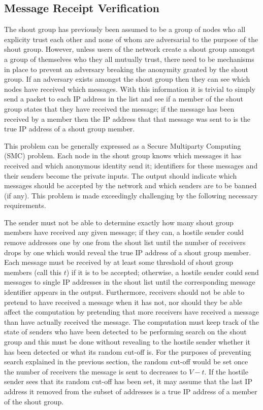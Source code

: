 \documentclass[ %
                    author={Luke Murray},
                supervisor={Dr. Simon Hollis},
                     title={Shadow Peer-to-Peer Networks},
                  subtitle={},
                    degree={MEng},
                      year={2013} ]{thesis}
\begin{document}
\subsection{Message Receipt Verification}

The shout group has previously been assumed to be a group of nodes who all explicity trust each other and none of whom are adversarial to the purpose of the shout group. However, unless users of the network create a shout group amongst a group of themselves who they all mutually trust, there need to be mechanisms in place to prevent an adversary breaking the anonymity granted by the shout group. If an adversary exists amongst the shout group then they can see which nodes have received which messages. With this information it is trivial to simply send a packet to each IP address in the list and see if a member of the shout group states that they have received the message; if the message has been received by a member then the IP address that that message was sent to is the true IP address of a shout group member.

This problem can be generally expressed as a Secure Multiparty Computing (SMC) problem. Each node in the shout group knows which messages it has received and which anonymous identity send it; identifiers for these messages and their senders become the private inputs. The output should indicate which messages should be accepted by the network and which senders are to be banned (if any). This problem is made exceedingly challenging by the following necessary requirements.

The sender must not be able to determine exactly how many shout group members have received any given message; if they can, a hostile sender could remove addresses one by one from the shout list until the number of receivers drops by one which would reveal the true IP address of a shout group member. Each message must be received by at least some threshold of shout group members (call this $t$) if it is to be accepted; otherwise, a hostile sender could send messages to single IP addresses in the shout list until the corresponding message identifier appears in the output. Furthermore, receivers should not be able to pretend to have received a message when it has not, nor should they be able affect the computation by pretending that more receivers have received a message than have actually received the message. The computation must keep track of the state of senders who have been detected to be performing search on the shout group and this must be done without revealing to the hostile sender whether it has been detected or what its random cut-off is. For the purposes of preventing search explained in the previous section, the random cut-off would be set once the number of receivers the message is sent to decreases to $V - t$. If the hostile sender sees that its random cut-off has been set, it may assume that the last IP address it removed from the subset of addresses is a true IP address of a member of the shout group. 
\end{document}
